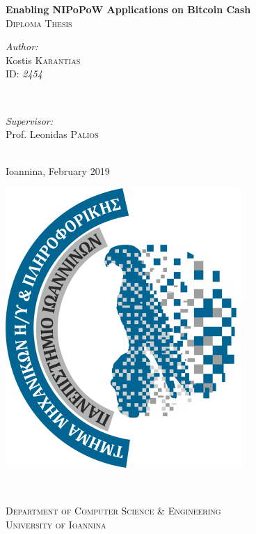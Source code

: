\begin{titlepage}
  \vspace*{\fill}
  \LARGE \textbf{Enabling NIPoPoW Applications on Bitcoin Cash} \\
  \center \textsc{\Large Diploma Thesis}\\[1cm]

  \begin{minipage}{0.4\textwidth}
    \begin{flushleft} \large
      \emph{Author:} \\
      Kostis \textsc{Karantias}\\
      ID: \emph{2454}
    \end{flushleft}
  \end{minipage}
    ~
  \begin{minipage}{0.5\textwidth}
    \begin{flushright} \large
      \emph{Supervisor:} \\
      Prof. Leonidas \textsc{Palios}
    \end{flushright}
  \end{minipage}\\[1cm]

  {\large Ioannina, February 2019}
  \vspace*{\fill}

  \begin{minipage}{0.4\textwidth}
    \begin{flushleft} \large
      \hspace*{-0.5cm}
      \includegraphics[scale=1]{cse-uoi-logo}\\
    \end{flushleft}
  \end{minipage}
    ~
  \begin{minipage}{0.5\textwidth}
    \begin{flushright}
      \textsc{\Large Department of Computer Science \& Engineering\\
      University of Ioannina}\\[0.4cm]
    \end{flushright}
  \end{minipage}\\
\end{titlepage}
